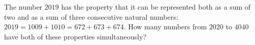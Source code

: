 The number $2019$ has the property that it can be represented both as a sum of two and as a sum of three consecutive natural numbers: $2019=1009+1010=672+673+674$. How many numbers from $2020$ to $4040$ have both of these properties simultaneously?
